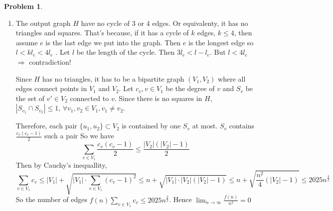\documentclass[a4paper]{article}
\theoremstyle{definition}
\newtheorem{problem}{Problem}
\theoremstyle{plain}
\newcommand{\dps}{\displaystyle}
\numberwithin{equation}{problem}
\begin{document}
\begin{problem}
\begin{enumerate}[label=(\alph*)]
\begin{proof}
      First, after (1),  $ \omega(e),e\in T $ will not be same as the cost of other edges, so they will never change after (2). Therefore, the cost of  $ T $  decreases  $ \dps\sum_{i=1}^t\frac{i}{t}$. Moerover, the cost of  any tree in  $ G $ has less decreased or even increased. So  $ T $ is still the MST.    

      Finally, we prove that apply Kruskal's Algorithm to the changed graph produces a same valid execution of Kruskal's Algorithm on the original $ G $.

      That's because, the change will not change the ordinal relationship between edges with distinct cost. So the effect of the change on the order is only to rearrange the edges with the same weight. So the effect of the change on the order is only to rearrange the edges with the same weight. Equivalently, the order of edges in Kruskal's Algorithm on the changed graph is still a valid order in Kruskal's Algorithm on  the original graph. Since Kruskal's Algorithm returns the same result if the order and the edges are determined, they produces the same MST,  $ T $. 
    \end{proof}

    \item The output graph  $ H $ have no cycle of 3 or 4 edges. Or equivalenty, it has no triangles and squares. That's because, 
    if it has a cycle of  $ k $ edges,  $ k \leq 4 $, then assume  $ e  $ is the last edge we put into the graph. Then  $ e $ is the longest edge so  $ l<kl_e<4l_e $ .  Let  $ l $ be the length of the cycle. Then     $ 3l_e <l-l_e  $. But  $ l<4l_e $ $ \Rightarrow  $ contradiction!

    Since  $ H $  has no triangles, it has to be a bipartite graph $ (V_1,V_2) $ where all edges connect points in  $ V_1 $ and  $ V_2 $. Let  $ c_v,v\in V_1 $ be the degree of  $ v $ and  $ S_v $ be the set of  $ v'\in V_2 $  connected to  $ v $. Since there is no squares in  $ H $,  $ |S_{v_1}\cap S_{v_2}| \leq 1,\,\forall v_1,v_2\in V_1,v_1\neq v_2 $.
    
    Therefore, each pair  $ \{u_1,u_2\}\subset V_2 $ is contained by one  $ S_v $ at most. $ S_v $ contains  $ \dps\frac{c_v(c_v-1)}{2} $ such a pair   So we have 
    \[\sum_{v\in V_1}\frac{c_v(c_v-1)}{2} \leq \frac{|V_2|(|V_2|-1)}{2}\]
    Then by Cauchy's inequallity, 
    \[\sum_{v\in V_1}c_v \leq |V_1|+\sqrt{|V_1|\cdot\sum_{v\in V_1}(c_v-1)^2} \leq n+\sqrt{|V_1|\cdot |V_2|(|V_2|-1)} \leq n+\sqrt{\frac{n^2}{4}(|V_2|-1)} \leq 2025n^{\frac{3}{2}} \]
    So the number of edges  $ f(n) \dps\sum_{v\in V_1}c_v \leq 2025n^{\frac{3}{2}} $. Hence  $ \dps\lim_{n\to\infty}\frac{f(n)}{n^2}=0 $   
  \end{enumerate}
\end{problem}
\end{document}

